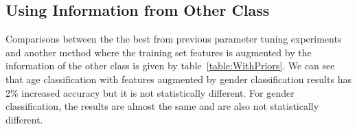 \documentclass[a4paper]{llncs}
\begin{document}
%
%


\subsection{Using Information from Other Class}
Comparisons between the the best from previous parameter tuning experiments and another method where the training set features is augmented by the information of the other class is given by table~\ref{table:WithPriors}. We can see that age classification with features augmented by gender classification results has 2\% increased accuracy but it is not statistically different. For gender classification, the results are almost the same and are also not statistically different. 
\end{document}
